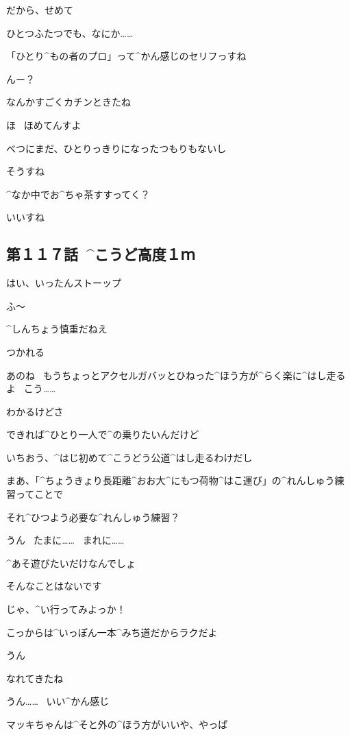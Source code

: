 \Sensei だから、せめて

\Sensei ひとつふたつでも、なにか……

\page
\Ojisan 「ひとり^{もの}{者}のプロ」って^{かん}{感}じのセリフっすね

\Sensei んー？

\Sensei なんかすごくカチンときたね

\Ojisan ほ
\ ほめてんすよ

\page
\Sensei べつにまだ、ひとりっきりになったつもりもないし

\Ojisan そうすね

\Sensei ^{なか}{中}でお^{ちゃ}{茶}すすってく？

\Ojisan いいすね


\subsection{第１１７話\ ^{こうど}{高度}１ｍ}

\page[91]
\Alpha はい、いったんストーップ

\Makki ふ〜

\Alpha ^{しんちょう}{慎重}だねえ

\Makki つかれる

\page
\Alpha あのね
\ もうちょっとアクセルガバッとひねった^{ほう}{方}が^{らく}{楽}に^{はし}{走}るよ
\ こう……

\Makki わかるけどさ

\Makki できれば^{ひとり}{一人}で^{の}{乗}りたいんだけど

\Alpha いちおう、^{はじ}{初}めて^{こうどう}{公道}^{はし}{走}るわけだし

\Alpha まあ、「^{ちょうきょり}{長距離}^{おお}{大}^{にもつ}{荷物}^{はこ}{運}び」の^{れんしゅう}{練習}ってことで

\Makki それ^{ひつよう}{必要}な^{れんしゅう}{練習}？

\page
\Alpha うん
\ たまに……
\ まれに……

\Makki ^{あそ}{遊}びたいだけなんでしょ

\Alpha そんなことはないです

\Alpha じゃ、^{い}{行}ってみよっか！

\Alpha こっからは^{いっぽん}{一本}^{みち}{道}だからラクだよ

\Makki うん

\page
\Alpha なれてきたね

\Makki うん……
\ いい^{かん}{感}じ

\page
\Alpha マッキちゃんは^{そと}{外}の^{ほう}{方}がいいや、やっぱ

